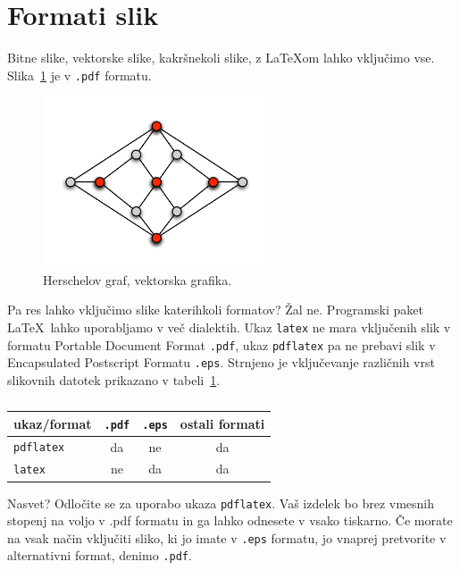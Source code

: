 \documentclass[a4paper, 12pt]{book}
\begin{document}
\section{Formati slik}

Bitne slike, vektorske slike, kakršnekoli slike, z \LaTeX{}om lahko vključimo vse.
Slika~\ref{pic1} je v {\tt .pdf} formatu.
\begin{figure}[h]
\begin{center}
\includegraphics[width=0.6\textwidth]{pic1.pdf}
\end{center}
\caption{Herschelov graf, vektorska grafika.}
\label{pic1}
\end{figure}
Pa res lahko vključimo slike katerihkoli formatov? 
Žal ne. 
Programski paket \LaTeX\ lahko uporabljamo v več dialektih. 
Ukaz {\tt latex} ne mara vključenih slik v formatu Portable Document Format {\tt .pdf}, ukaz {\tt pdflatex} pa ne prebavi slik v Encapsulated Postscript Formatu {\tt .eps}.
Strnjeno je vključevanje različnih vrst slikovnih datotek prikazano v tabeli~\ref{tbl:1}.

\begin{table}
\begin{center}
\begin{tabular}{l|ccc}
ukaz/format & {\tt .pdf} & {\tt .eps} & ostali formati \\ \hline
{\tt pdflatex} & da & ne & da \\
{\tt latex}   & ne & da  & da
\end{tabular}
\end{center}
\caption{}
\label{tbl:1}
\end{table}

Nasvet? 
Odločite se za uporabo ukaza {\tt pdflatex}. Vaš izdelek bo brez vmesnih stopenj na voljo v {.pdf} formatu in ga lahko odnesete v vsako tiskarno. 
Če morate na vsak način vključiti sliko, ki jo imate v {\tt .eps} formatu, jo vnaprej pretvorite v alternativni format, denimo {\tt .pdf}.
\end{document}
